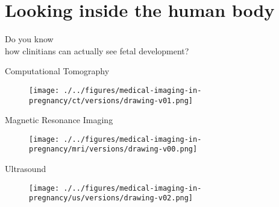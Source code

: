 \section{Looking inside the human body}

{
\begin{frame}{}

\BigSizeFont
\begin{center}
    Do you know \\
    how clinitians can actually see fetal development?
\end{center}


\end{frame}
}


{
\begin{frame}{Computational Tomography}
      \begin{figure}
        \centering
        \texttt{[image: ./../figures/medical-imaging-in-pregnancy/ct/versions/drawing-v01.png]}
      \end{figure}
\end{frame}
}


{
\begin{frame}{Magnetic Resonance Imaging}
      \begin{figure}
        \centering
        \texttt{[image: ./../figures/medical-imaging-in-pregnancy/mri/versions/drawing-v00.png]}
      \end{figure}
\end{frame}
}


{
\begin{frame}{Ultrasound}
      \begin{figure}
        \centering
        \texttt{[image: ./../figures/medical-imaging-in-pregnancy/us/versions/drawing-v02.png]}
      \end{figure}
\end{frame}
}

